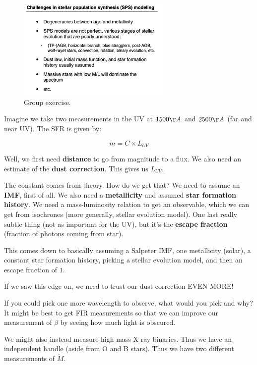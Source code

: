 \documentclass{article}
\begin{document}
\begin{figure}
    \centering
    \includegraphics[width=0.66\textwidth]{figs/Screen Shot 2021-09-24 at 9.35.27 AM.png}
    \caption{Group exercise.}
    \label{fig:group}
\end{figure}

Imagine we take two measurements in the UV at $1500\AA$ and $2500\AA$ (far and near UV). The SFR is given by:

\begin{equation}
    \dot{m} = C \times L_{UV}
\end{equation}

Well, we first need \textbf{distance} to go from magnitude to a flux. We also need an estimate of the \textbf{dust correction}. This gives us $L_{UV}$. 

The constant comes from theory. How do we get that? We need to assume an \textbf{IMF}, first of all. We also need a \textbf{metallicity} and assumed \textbf{star formation history}. We need a mass-luminosity relation to get an observable, which we can get from isochrones (more generally, stellar evolution model). One last really subtle thing (not as important for the UV), but it's the \textbf{escape fraction} (fraction of photons coming from star). 

This comes down to basically assuming a Salpeter IMF, one metallicity (solar), a constant star formation history, picking a stellar evolution model, and then an escape fraction of $1$. 

If we saw this edge on, we need to trust our dust correction EVEN MORE!

If you could pick one more wavelength to observe, what would you pick and why? It might be best to get FIR measurements so that we can improve our measurement of $\beta$ by seeing how much light is obscured. 

We might also instead measure high mass X-ray binaries. Thus we have an independent handle (aside from O and B stars). Thus we have two different measurements of $\dot{M}$. 
\end{document}
